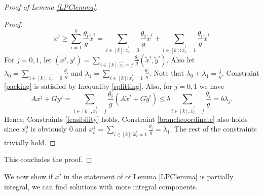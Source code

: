 \begin{proof}[Proof of Lemma \ref{LPClemma}]
\begin{proof}
\begin{equation}\label{splitting}
 x'\geq \sum_{i=1}^{k}\frac{\theta_i}{g} \tilde{x}^i
  ={\sum_{i\in [k]: \tilde{x}^i_\ell =0}\frac{\theta_i}{g} \tilde{x}^i}+{\sum_{i\in [k]: \tilde{x}^i_\ell =1}\frac{\theta_i}{g} \tilde{x}^i}
\end{equation}
For $j=0,1$, let $(x^j,y^j) = \sum_{i\in [k]:\tilde{x}^i_\ell=j} \frac{\theta_i}{g}(\tilde{x}^i,\tilde{y}^i)$. Also let $\lambda_0=\sum_{i\in [k]: \tilde{x}^i_\ell =0}\frac{\theta_i}{g}$ and $\lambda_1 = \sum_{i\in [k]: \tilde{x}^i_\ell =1}\frac{\theta_i}{g}$. Note that $\lambda_0+\lambda_1 = \frac{1}{g}$. Constraint \ref{packing} is satisfied by Inequality \ref{splitting}. Also, for $j=0,1$ we have
\begin{equation}
 Ax^j+Gy^j = \sum_{i\in[k], \tilde{x}^i_\ell = j} \frac{\theta_i}{g} (A\tilde{x}^i + G\tilde{y}^i) \leq b \sum_{i\in[k], \tilde{x}^i_\ell = j} \frac{\theta_i}{g} = b\lambda_j.
\end{equation}
Hence, Constraints \ref{feasibility} holds. Constraint \ref{branchcoordinate} also holds since $x^0_\ell$ is obviously $0$ and $x^1_\ell= \sum_{i\in [k]: \tilde{x}^i_\ell = 1}\frac{\theta_i}{g}= \lambda_1$. The rest of the constraints trivially hold. 
\end{proof}
This concludes the proof.	
\end{proof}

We now show if $x'$ in the statement of of Lemma \ref{LPClemma} is partially integral, we can find solutions with more integral components.

